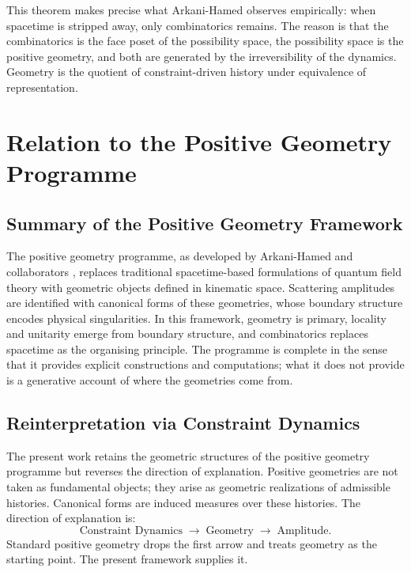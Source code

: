\documentclass[12pt, oneside]{amsart}
\theoremstyle{plain}
\theoremstyle{definition}
\theoremstyle{remark}
\begin{document}
This theorem makes precise what Arkani-Hamed observes empirically: when spacetime is stripped away, only combinatorics remains. The reason is that the combinatorics is the face poset of the possibility space, the possibility space is the positive geometry, and both are generated by the irreversibility of the dynamics. Geometry is the quotient of constraint-driven history under equivalence of representation.

\section{Relation to the Positive Geometry Programme}
\label{sec:relation}

\subsection{Summary of the Positive Geometry Framework}

The positive geometry programme, as developed by Arkani-Hamed and collaborators \cite{ArkaniHamed2017, ArkaniHamed2014, ArkaniHamed2012}, replaces traditional spacetime-based formulations of quantum field theory with geometric objects defined in kinematic space. Scattering amplitudes are identified with canonical forms of these geometries, whose boundary structure encodes physical singularities. In this framework, geometry is primary, locality and unitarity emerge from boundary structure, and combinatorics replaces spacetime as the organising principle. The programme is complete in the sense that it provides explicit constructions and computations; what it does not provide is a generative account of where the geometries come from.

\subsection{Reinterpretation via Constraint Dynamics}

The present work retains the geometric structures of the positive geometry programme but reverses the direction of explanation. Positive geometries are not taken as fundamental objects; they arise as geometric realizations of admissible histories. Canonical forms are induced measures over these histories. The direction of explanation is:
\[
  \text{Constraint Dynamics} \;\longrightarrow\; \text{Geometry} \;\longrightarrow\; \text{Amplitude}.
\]
Standard positive geometry drops the first arrow and treats geometry as the starting point. The present framework supplies it.
\end{document}
